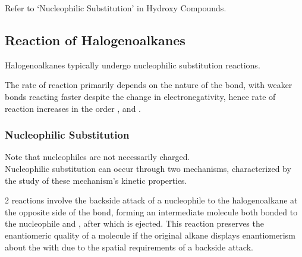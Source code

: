 \documentclass[../main]{subfiles}
\begin{document}
	Refer to `Nucleophilic Substitution' in Hydroxy Compounds. \\

	\subsection{Reaction of Halogenoalkanes}

	Halogenoalkanes typically undergo nucleophilic substitution reactions.

	The rate of reaction primarily depends on the nature of the  bond, with weaker bonds reacting faster despite the change in electronegativity, hence rate of reaction increases in the order , and . \\

	\subsubsection{Nucleophilic Substitution}


	Note that nucleophiles are not necessarily charged. \\

	Nucleophilic substitution can occur through two mechanisms, characterized by the study of these mechanism's kinetic properties.


	2 reactions involve the backside attack of a nucleophile to the halogenoalkane at the opposite side of the  bond, forming an intermediate molecule both bonded to the nucleophile and , after which  is ejected. This reaction preserves the enantiomeric quality of a molecule if the original alkane displays enantiomerism about the  with  due to the spatial requirements of a backside attack. 

	 \\
\end{document}
